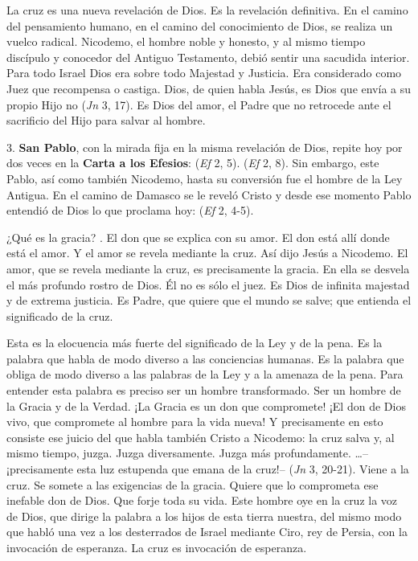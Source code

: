 \begin{body}
La cruz es una nueva revelación de Dios. Es la revelación definitiva. En el camino del pensamiento humano, en el camino del conocimiento de Dios, se realiza un vuelco radical. Nicodemo, el hombre noble y honesto, y al mismo tiempo discípulo y conocedor del Antiguo Testamento, debió sentir una sacudida interior. Para todo Israel Dios era sobre todo Majestad y Justicia. Era considerado como Juez que recompensa o castiga. Dios, de quien habla Jesús, es Dios que envía a su propio Hijo no  (\textit{Jn} 3, 17). Es Dios del amor, el Padre que no retrocede ante el sacrificio del Hijo para salvar al hombre.

3. \textbf{San Pablo}, con la mirada fija en la misma revelación de Dios, repite hoy por dos veces en la \textbf{Carta a los Efesios}:  (\textit{Ef} 2, 5).  (\textit{Ef} 2, 8). Sin embargo, este Pablo, así como también Nicodemo, hasta su conversión fue el hombre de la Ley Antigua. En el camino de Damasco se le reveló Cristo y desde ese momento Pablo entendió de Dios lo que proclama hoy:  (\textit{Ef} 2, 4-5).

¿Qué es la gracia? . El don que se explica con su amor. El don está allí donde está el amor. Y el amor se revela mediante la cruz. Así dijo Jesús a Nicodemo. El amor, que se revela mediante la cruz, es precisamente la gracia. En ella se desvela el más profundo rostro de Dios. Él no es sólo el juez. Es Dios de infinita majestad y de extrema justicia. Es Padre, que quiere que el mundo se salve; que entienda el significado de la cruz. 

Esta es la elocuencia más fuerte del significado de la Ley y de la pena. Es la palabra que habla de modo diverso a las conciencias humanas. Es la palabra que obliga de modo diverso a las palabras de la Ley y a la amenaza de la pena. Para entender esta palabra es preciso ser un hombre transformado. Ser un hombre de la Gracia y de la Verdad. ¡La Gracia es un don que compromete! ¡El don de Dios vivo, que compromete al hombre para la vida nueva! Y precisamente en esto consiste ese juicio del que habla también Cristo a Nicodemo: la cruz salva y, al mismo tiempo, juzga. Juzga diversamente. Juzga más profundamente.  \ldots –¡precisamente esta luz estupenda que emana de la cruz!–  (\textit{Jn} 3, 20-21). Viene a la cruz. Se somete a las exigencias de la gracia. Quiere que lo comprometa ese inefable don de Dios. Que forje toda su vida. Este hombre oye en la cruz la voz de Dios, que dirige la palabra a los hijos de esta tierra nuestra, del mismo modo que habló una vez a los desterrados de Israel mediante Ciro, rey de Persia, con la invocación de esperanza. La cruz es invocación de esperanza.


\end{body}
